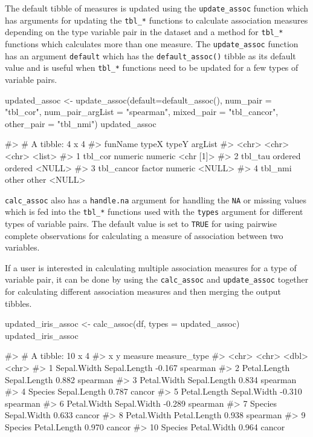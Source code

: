 The default tibble of measures is updated using the
\texttt{update\_assoc} function which has arguments for updating the
\texttt{tbl\_*} functions to calculate association measures depending on
the type variable pair in the dataset and a method for \texttt{tbl\_*}
functions which calculates more than one measure. The
\texttt{update\_assoc} function has an argument \texttt{default} which
has the \texttt{default\_assoc()} tibble as its default value and is
useful when \texttt{tbl\_*} functions need to be updated for a few types
of variable pairs.

\begin{Schunk}
\begin{Sinput}
updated_assoc <- update_assoc(default=default_assoc(),
                              num_pair = "tbl_cor",
                              num_pair_argList = "spearman",
                              mixed_pair = "tbl_cancor",
                              other_pair = "tbl_nmi")
updated_assoc
\end{Sinput}
\begin{Soutput}
#> # A tibble: 4 x 4
#>   funName    typeX   typeY   argList  
#>   <chr>      <chr>   <chr>   <list>   
#> 1 tbl_cor    numeric numeric <chr [1]>
#> 2 tbl_tau    ordered ordered <NULL>   
#> 3 tbl_cancor factor  numeric <NULL>   
#> 4 tbl_nmi    other   other   <NULL>
\end{Soutput}
\end{Schunk}

\texttt{calc\_assoc} also has a \texttt{handle.na} argument for handling
the \texttt{NA} or missing values which is fed into the \texttt{tbl\_*}
functions used with the \texttt{types} argument for different types of
variable pairs. The default value is set to \texttt{TRUE} for using
pairwise complete observations for calculating a measure of association
between two variables.

If a user is interested in calculating multiple association measures for
a type of variable pair, it can be done by using the
\texttt{calc\_assoc} and \texttt{update\_assoc} together for calculating
different association measures and then merging the output tibbles.

\begin{Schunk}
\begin{Sinput}
updated_iris_assoc <- calc_assoc(df, types = updated_assoc)
updated_iris_assoc
\end{Sinput}
\begin{Soutput}
#> # A tibble: 10 x 4
#>    x            y            measure measure_type
#>    <chr>        <chr>          <dbl> <chr>       
#>  1 Sepal.Width  Sepal.Length  -0.167 spearman    
#>  2 Petal.Length Sepal.Length   0.882 spearman    
#>  3 Petal.Width  Sepal.Length   0.834 spearman    
#>  4 Species      Sepal.Length   0.787 cancor      
#>  5 Petal.Length Sepal.Width   -0.310 spearman    
#>  6 Petal.Width  Sepal.Width   -0.289 spearman    
#>  7 Species      Sepal.Width    0.633 cancor      
#>  8 Petal.Width  Petal.Length   0.938 spearman    
#>  9 Species      Petal.Length   0.970 cancor      
#> 10 Species      Petal.Width    0.964 cancor
\end{Soutput}
\end{Schunk}

